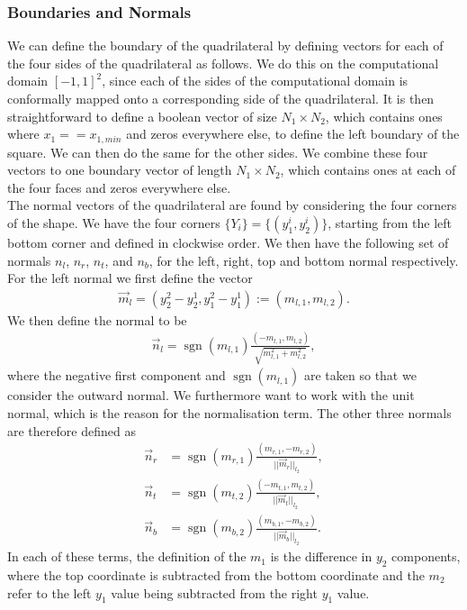 \documentclass[11pt, a4paper]{article}
\theoremstyle{definition}
\DeclareMathOperator{\sgn}{sgn}
\begin{document}
\subsubsection{Boundaries and Normals}
We can define the boundary of the quadrilateral by defining vectors for each of the four sides of the quadrilateral as follows. We do this on the computational domain $[-1,1]^2$, since each of the sides of the computational domain is conformally mapped onto a corresponding side of the quadrilateral. It is then straightforward to define a boolean vector of size $N_1 \times N_2$, which contains ones where $x_1 == x_{1,min}$ and zeros everywhere else, to define the left boundary of the square. We can then do the same for the other sides. We combine these four vectors to one boundary vector of length $N_1 \times N_2$, which contains ones at each of the four faces and zeros everywhere else. 
\\
The normal vectors of the quadrilateral are found by considering the four corners of the shape. We have the four corners $\{Y_i\} = \{(y_1^i,y_2^i)\}$, starting from the left bottom corner and defined in clockwise order. We then have the following set of normals $n_l$, $n_r$, $n_t$, and $n_b$, for the left, right, top and bottom normal respectively.
For the left normal we first define the vector
\begin{align*}
     \vec m_l = \left(y_2^2 - y_2^1, y_1^2 - y_1^1 \right) := \left(m_{l,1},m_{l,2} \right). 
\end{align*}
We then define the normal to be
\begin{align*}
	\vec n_l =  \sgn (m_{l,1})\frac{\left(-m_{l,1},m_{l,2} \right)}{\sqrt{m_{l,1}^2+m_{l,2}^2 }},
\end{align*}
where the negative first component and $\sgn (m_{l,1})$ are taken so that we 
consider the outward normal. We furthermore want to work with the unit normal, which is the reason for the normalisation term. The other three normals are therefore defined as
\begin{align*}
	\vec n_r &=  \sgn (m_{r,1})\frac{\left(m_{r,1}, - m_{r,2} \right)}{||\vec m_{r} ||_{l_2}},\\
	\vec n_t &=  \sgn (m_{t,2})\frac{\left(-m_{t,1},m_{t,2} \right)}{||\vec m_{t} ||_{l_2}},\\
	\vec n_b &=  \sgn (m_{b,2})\frac{\left(m_{b,1},-m_{b,2} \right)}{||\vec m_{b} ||_{l_2}}.
\end{align*}
In each of these terms, the definition of the $m_1$ is the difference in $y_2$ components, where the top coordinate is subtracted from the bottom coordinate and the $m_2$ refer to the left $y_1$ value being subtracted from the right $y_1$ value.
\end{document}
